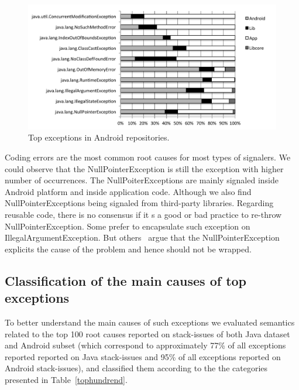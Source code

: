 \documentclass[conference]{IEEEtran}
\begin{document}
\begin{figure}
\centering
\includegraphics[width=\hsize]{top_exceptios_android.pdf}
\caption{Top exceptions in Android repositories.}
\label{fig:androidsignaler}
\end{figure}

Coding errors are the most common root causes for most types of signalers. We could observe that the NullPointerException is still the exception with higher number of occurrences. The NullPoiterExceptions are mainly signaled inside Android platform and inside application code. Although we also find NullPointerExceptions being signaled from third-party libraries. Regarding reusable code, there is no consensus if it s a good or bad practice to re-throw NullPointerException. Some prefer to encapsulate such exception on IllegalArgumentException. But others~\cite{joshuabloch} argue that the NullPointerException  explicits the cause of the problem and hence should not be wrapped. 


\subsection{Classification of the main causes of top exceptions}

To better understand the main causes of such exceptions we evaluated semantics related to the top 100 root causes reported on stack-issues of both Java dataset and Android subset (which correspond to approximately 77\% of all exceptions reported reported on Java stack-issues and 95\% of all exceptions reported on Android stack-issues), and classified them according to the the categories presented in Table~\ref{tophundrend}.
\end{document}
